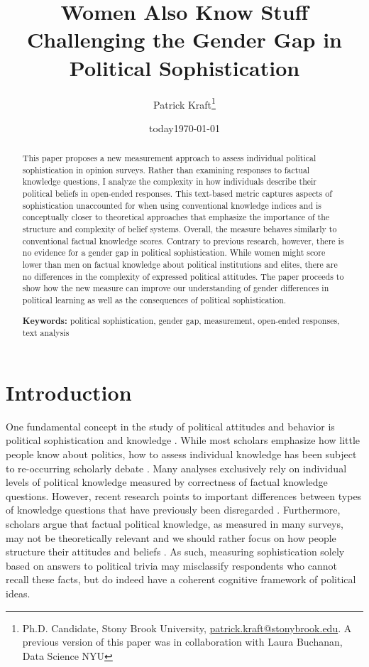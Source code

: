 \documentclass[12pt]{article}
\author{Patrick Kraft\footnote{Ph.D. Candidate, Stony Brook University, \href{mailto:patrick.kraft@stonybrook.edu}{patrick.kraft@stonybrook.edu}. A previous version of this paper was in collaboration with Laura Buchanan, Data Science NYU}}
\date{today}
\title{Women Also Know Stuff\\
\large{Challenging the Gender Gap in Political Sophistication}}
\date{\today}
\begin{document}
\maketitle\doublespacing\thispagestyle{empty}

\begin{abstract}
This paper proposes a new measurement approach to assess individual political sophistication in opinion surveys. Rather than examining responses to factual knowledge questions, I analyze the complexity in how individuals describe their political beliefs in open-ended responses. This text-based metric captures aspects of sophistication unaccounted for when using conventional knowledge indices and is conceptually closer to theoretical approaches that emphasize the importance of the structure and complexity of belief systems. Overall, the measure behaves similarly to conventional factual knowledge scores. Contrary to previous research, however, there is no evidence for a gender gap in political sophistication. While women might score lower than men on factual knowledge about political institutions and elites, there are no differences in the complexity of expressed political attitudes. The paper proceeds to show how the new measure can improve our understanding of gender differences in political learning as well as the consequences of political sophistication.

\vspace{\baselineskip}
\noindent \textbf{Keywords:} political sophistication, gender gap, measurement, open-ended responses, text analysis \\

\end{abstract}
\newpage\setcounter{page}{1}


\section*{Introduction}

One fundamental concept in the study of political attitudes and behavior is political sophistication and knowledge \citep{converse1964nature,carpini1996americans}. While most scholars emphasize how little people know about politics, how to assess individual knowledge has been subject to re-occurring scholarly debate \citep[e.g.][]{mondak2000reconsidering,mondak2001asked,sturgis2008experiment,debell2013harder,pietryka2013analysis}. Many analyses exclusively rely on individual levels of political knowledge measured by correctness of factual knowledge questions. However, recent research points to important differences between types of knowledge questions that have previously been disregarded \citep{barabas2014question}. Furthermore, scholars argue that factual political knowledge, as measured in many surveys, may not be theoretically relevant \citep{lupia2006elitism} and we should rather focus on how people structure their attitudes and beliefs \citep[e.g.][]{luskin1987measuring}. As such, measuring sophistication solely based on answers to political trivia may misclassify respondents who cannot recall these facts, but do indeed have a coherent cognitive framework of political ideas.
\end{document}
